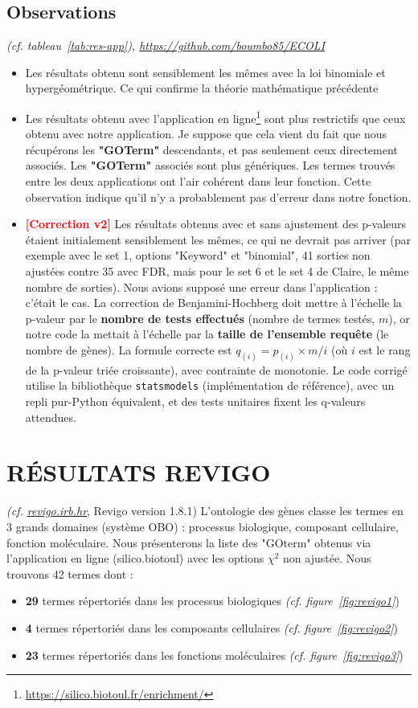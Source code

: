 \documentclass[a4paper,11pt,openright]{report}
\begin{document}
		\subsection{Observations} 
\textit{(cf. tableau~\ref{tab:res-app}), \url{https://github.com/boumbo85/ECOLI}}
\begin{itemize}
	\item Les résultats obtenu sont sensiblement les mêmes avec la loi binomiale et hypergéométrique. Ce qui confirme la théorie mathématique précédente
	\item Les résultats obtenu avec l'application en ligne\footnote{\url{https://silico.biotoul.fr/enrichment/}} sont plus restrictifs que ceux obtenu avec notre application. Je suppose que cela vient du fait que nous récupérons les \textbf{"GOTerm"} descendants, et pas seulement ceux directement associés. Les \textbf{"GOTerm"} associés sont plus génériques. Les termes trouvés entre les deux applications ont l'air cohérent dans leur fonction. Cette observation indique qu'il n'y a probablement pas d'erreur dans notre fonction. 
	\item \textbf{\textcolor{red}{[Correction v2]}} Les résultats obtenus avec et sans ajustement des p-valeurs étaient initialement sensiblement les mêmes, ce qui ne devrait pas arriver (par exemple avec le set 1, options "Keyword" et "binomial", 41 sorties non ajustées contre 35 avec FDR, mais pour le set 6 et le set 4 de Claire, le même nombre de sorties). Nous avions supposé une erreur dans l'application : c'était le cas. La correction de Benjamini-Hochberg doit mettre à l'échelle la p-valeur par le \textbf{nombre de tests effectués} (nombre de termes testés, $m$), or notre code la mettait à l'échelle par la \textbf{taille de l'ensemble requête} (le nombre de gènes). La formule correcte est $q_{(i)} = p_{(i)} \times m / i$ (où $i$ est le rang de la p-valeur triée croissante), avec contrainte de monotonie. Le code corrigé utilise la bibliothèque \texttt{statsmodels} (implémentation de référence), avec un repli pur-Python équivalent, et des tests unitaires fixent les q-valeurs attendues.
\end{itemize}


 	\section{RÉSULTATS REVIGO}
\textit{(cf. \url{revigo.irb.hr}}, Revigo version 1.8.1)
L’ontologie des gènes classe les termes en 3 grands domaines (système OBO) : processus biologique, composant cellulaire, fonction moléculaire. Nous présenterons la liste des "GOterm" obtenus via l'application en ligne (silico.biotoul) avec les options $\chi^2$ non ajustée. Nous trouvons 42 termes dont :
\begin{itemize}
	\item \textbf{29} termes répertoriés dans les processus biologiques \textit{(cf. figure~\ref{fig:revigo1}})
	\item \textbf{4} termes répertoriés dans les composants cellulaires \textit{(cf. figure~\ref{fig:revigo2}})
	\item \textbf{23} termes répertoriés dans les fonctions moléculaires \textit{(cf. figure~\ref{fig:revigo3}})
\end{itemize}
\end{document}
